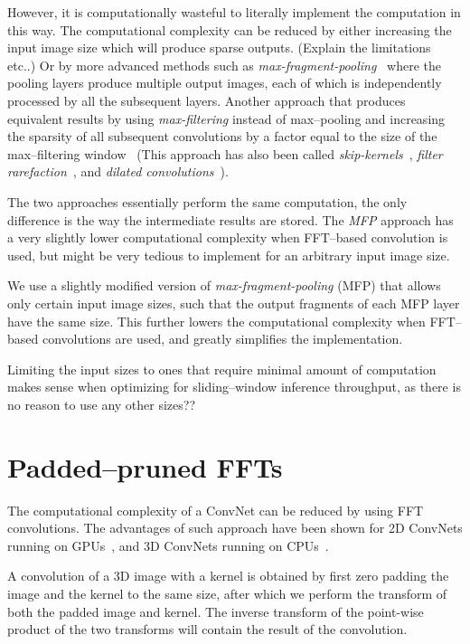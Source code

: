 \documentclass[conference]{IEEEtran}
\begin{document}
  However, it is computationally wasteful to literally implement the
  computation in this way.  The computational complexity can be
  reduced by either increasing the input image size which will produce
  sparse outputs. (Explain the limitations etc..) Or by more advanced
  methods such as
  \emph{max-fragment-pooling}~\cite{giusti2013fast,masci2013fast}
  where the pooling layers produce multiple output images, each of
  which is independently processed by all the subsequent layers.
  Another approach that produces equivalent results by using
  \emph{max-filtering} instead of max--pooling and increasing the
  sparsity of all subsequent convolutions by a factor equal to the
  size of the max--filtering window~\cite{zlateski2015znn} (This
  approach has also been called
  \emph{skip-kernels}~\cite{sermanet2013overfeat}, \emph{filter
    rarefaction}~\cite{long2015fully}, and \emph{dilated
    convolutions}~\cite{yu2015multi}).

  The two approaches essentially perform the same computation, the
  only difference is the way the intermediate results are stored.  The
  \emph{MFP} approach has a very slightly
  lower computational complexity when FFT--based convolution is used,
  but might be very tedious to implement for an arbitrary input image
  size.

  We use a slightly modified version of
  \emph{max-fragment-pooling} (MFP) that allows only certain
  input image sizes, such that the output fragments of each MFP layer
  have the same size.  This further lowers the computational
  complexity when FFT--based convolutions are used, and greatly
  simplifies the implementation.

  Limiting the input sizes to ones that require minimal amount of
  computation makes sense when optimizing for sliding--window
  inference throughput, as there is no reason to use any other sizes??




\section{Padded--pruned FFTs}

  The computational complexity of a ConvNet can be reduced by using
  FFT convolutions.  The advantages of such approach have been shown
  for 2D ConvNets running on
  GPUs~\cite{mathieu-iclr-14,vasilache2014fast}, and 3D ConvNets
  running on CPUs~\cite{zlateski2015znn}.

  A convolution of a 3D image with a kernel is obtained by first zero
  padding the image and the kernel to the same size, after which we
  perform the transform of both the padded image and kernel.  The
  inverse transform of the point-wise product of the two transforms
  will contain the result of the convolution.
\end{document}

